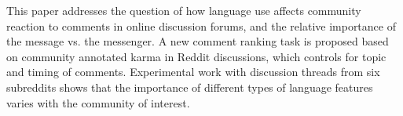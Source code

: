 This paper addresses the question of how language use affects community reaction to comments in online discussion forums, and the relative importance of the message vs. the messenger. A new comment ranking task is proposed based on community annotated karma in Reddit discussions, which controls for topic and timing of comments. Experimental work with discussion threads from six subreddits shows that the importance of different types of language features varies with the community of interest.
